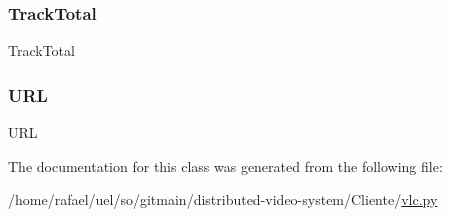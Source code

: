 \subsubsection{\texorpdfstring{Track\+Total}{TrackTotal}}
{\footnotesize\ttfamily Track\+Total\hspace{0.3cm}{\ttfamily [static]}}

\mbox{\label{classvlc_1_1_meta_a137e9820b1471188f4c68eba640db272}} 
\subsubsection{\texorpdfstring{U\+RL}{URL}}
{\footnotesize\ttfamily U\+RL\hspace{0.3cm}{\ttfamily [static]}}



The documentation for this class was generated from the following file\+:\begin{DoxyCompactItemize}
\item 
/home/rafael/uel/so/gitmain/distributed-\/video-\/system/\+Cliente/\hyperlink{vlc_8py}{vlc.\+py}\end{DoxyCompactItemize}
